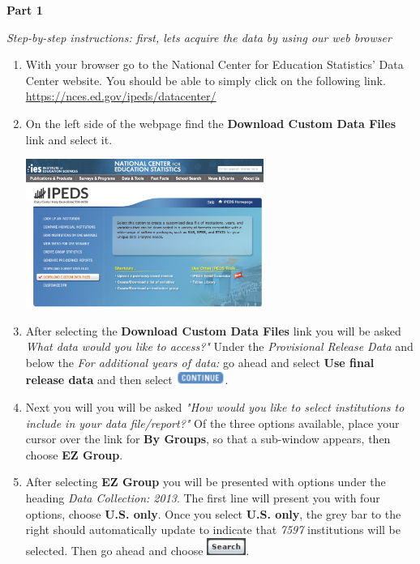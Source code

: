 \documentclass{article}
\begin{document}
{\begin{enumerate}[leftmargin=15mm]
\end{enumerate}

\large{\textbf{Part 1}}

\vspace{4mm}
\setlength{\leftskip}{1cm}
\textit{Step-by-step instructions: first, lets acquire the data by using our web browser}

\begin{enumerate}[leftmargin=15mm]

\item With your browser go to the National Center for Education Statistics' Data Center website.  You should be able to simply click on the following link.\\ 
\url{https://nces.ed.gov/ipeds/datacenter/}

\item On the left side of the webpage find the \textbf{Download Custom Data Files} link and select it.  
\begin{flushright}{\includegraphics[width=0.61\textwidth]{homepage.png}}\end{flushright}
 
\item After selecting the \textbf{Download Custom Data Files} link you will be asked \textit{What data would you like to access?"} Under the \textit{Provisional Release Data} and below the \textit{For additional years of data:} go ahead and select \textbf{Use final release data} and then select \includegraphics[width=0.125\textwidth]{continue.png}.

\item Next you will you will be asked \textit{"How would you like to select institutions to include in your data file/report?"}  Of the three options available, place your cursor over the link for \textbf{By Groups}, so that a sub-window appears, then choose \textbf{EZ Group}.

\item After selecting \textbf{EZ Group} you will be presented with options under the heading \textit{Data Collection: 2013}.  The first line will present you with four options, choose \textbf{U.S. only}.  Once you select \textbf{U.S. only}, the grey bar to the right should automatically update to indicate that \textit{7597} institutions will be selected.  Then go ahead and choose \includegraphics[width=0.1\textwidth]{search.png}.


\end{enumerate}}
\end{document}
